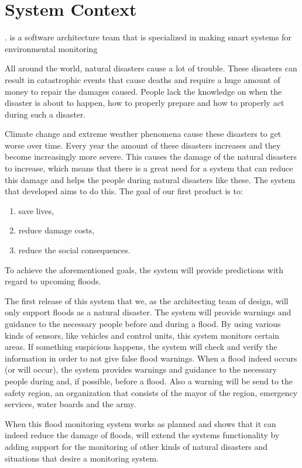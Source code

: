 \chapter{System Context}
\label{ch:context}

\CompanyName. is a software architecture team that is specialized in making smart systems for environmental monitoring

All around the world, natural disasters cause a lot of trouble. These disasters can result in catastrophic events that cause deaths and require a huge amount of money to repair the damages caused. People lack the knowledge on when the disaster is about to happen, how to properly prepare and how to properly act during such a disaster.

Climate change and extreme weather phenomena cause these disasters to get worse over time. Every year the amount of these disasters increases and they become increasingly more severe. This causes the damage of the natural disasters to increase, which means that there is a great need for a system that can reduce this damage and helps the people during natural disasters like these. The system that developed aims to do this.
The goal of our first product is to:
\begin{enumerate}
	\item save lives,
	\item reduce damage costs,
	\item reduce the social consequences.
\end{enumerate}

To achieve the aforementioned goals, the system will provide predictions with regard to upcoming floods.

The first release of this system that we, as the architecting team of \CompanyName design, will only support floods as a natural disaster. The system will provide warnings and guidance to the necessary people before and during a flood. By using various kinds of sensors, like vehicles and control units, this system monitors certain areas. If something suspicious happens, the system will check and verify the information in order to not give false flood warnings. When a flood indeed occurs (or will occur), the system provides warnings and guidance to the necessary people during and, if possible, before a flood. Also a warning will be send to the safety region, an organization that consists of the mayor of the region, emergency services, water boards and the army. 

When this flood monitoring system works as planned and shows that it can indeed reduce the damage of floods, \CompanyName will extend the systems functionality  by adding support for the monitoring of other kinds of natural disasters and situations that desire a monitoring system.

